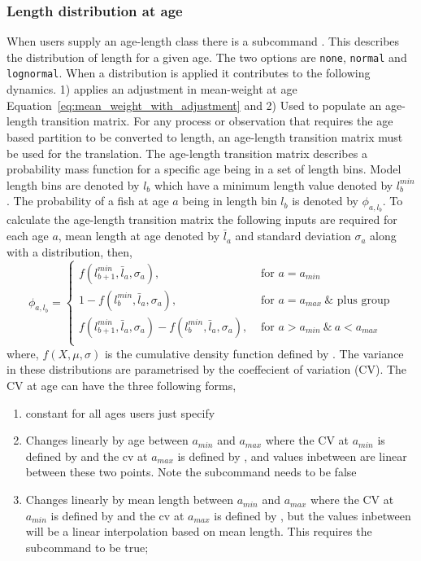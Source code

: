 \subsubsection{Length distribution at age}\label{sec:AgeLength-length_at_age}
When users supply an age-length class there is a subcommand . This describes the distribution of length for a given age. The two options are \texttt{none}, \texttt{normal} and \texttt{lognormal}. When a distribution is applied it contributes to the following dynamics. 1) applies an adjustment in mean-weight at age Equation~\ref{eq:mean_weight_with_adjustment} and 2) Used to populate an age-length transition matrix. For any process or observation that requires the age based partition to be converted to length, an age-length transition matrix must be used for the translation. The age-length transition matrix describes a probability mass function for a specific age being in a set of length bins. Model length bins are denoted by \(l_b\) which have a minimum length value denoted by \(l_b^{min}\). The probability of a fish at age \(a\) being in length bin \(l_b\) is denoted by \(\phi_{a,l_b}\). To calculate the age-length transition matrix the following inputs are required for each age \(a\), mean length at age denoted by \(\bar{l}_a\) and standard deviation \(\sigma_a\) along with a distribution, then,
\begin{equation}
	\phi_{a,l_b} = 
	\begin{cases}
		f(l_{b + 1}^{min},\bar{l}_a, \sigma_a), & \text{ for } a = a_{min}\\
		1 - f(l_{b}^{min},\bar{l}_a, \sigma_a), & \text{ for } a = a_{max} \ \& \text{ plus group}\\
		f(l_{b+1}^{min},\bar{l}_a, \sigma_a) - f(l_{b}^{min},\bar{l}_a, \sigma_a), & \text{ for } a > a_{min} \ \& \ a < a_{max} \\				
	\end{cases}
\end{equation}
%
where, \(f(X,\mu, \sigma)\) is the cumulative density function defined by . The variance in these distributions are parametrised by the coeffecient of variation (CV). The CV at age can have the three following forms,
\begin{enumerate}
	\item constant for all ages users just specify \\
	\item Changes linearly by age between \(a_{min}\) and \(a_{max}\) where the CV at \(a_{min}\) is defined by  and the cv at \(a_{max}\) is defined by , and values inbetween are linear between these two points. Note the subcommand  needs to be false
	\item Changes linearly by mean length between \(a_{min}\) and \(a_{max}\) where the CV at \(a_{min}\) is defined by  and the cv at \(a_{max}\) is defined by , but the values inbetween will be a linear interpolation based on mean length. This requires the subcommand  to be true;
\end{enumerate}
